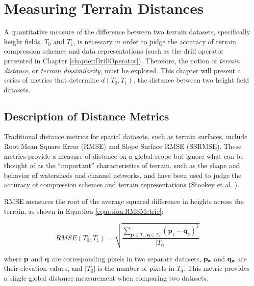\chapter{Measuring Terrain Distances}
\label{chapter:TerrainDistances}

A quantitative measure of the difference between two terrain datasets, specifically height fields, $T_{0}$ and $T_{1}$, is necessary 
in order to judge the accuracy of terrain compression schemes and data representations (such as the drill operator presented in Chapter \ref{chapter:DrillOperator}).
Therefore, the notion of \textit{terrain distance}, or \textit{terrain dissimilarity}, must be explored. This chapter will present a series of metrics that determine $d\left(T_{0}, T_{1}\right)$, the distance between two height field datasets.

\section{Description of Distance Metrics}
\label{section:DescriptionOfMetrics}

Traditional distance metrics for spatial datasets, such as terrain surfaces, include Root Mean Square Error (RMSE) and Slope Surface RMSE (SSRMSE). These metrics provide a measure of 
distance on a global scope but ignore what can be thought of as the ``important'' characteristics of terrain, such as the shape and behavior of watersheds and channel networks,
and have been used to judge the accuracy of compression schemes and terrain representations (Stookey et al. \cite{Stookey08parallelodetlap}).


RMSE measures the root of the average squared difference in heights across the terrain, as shown in Equation \ref{equation:RMSMetric}:

\begin{equation}
\label{equation:RMSMetric}
  RMSE\left(T_{0}, T_{1}\right) = \sqrt{ \frac{\displaystyle\sum_{\textbf{p}\in T_{0}, \textbf{q} \in T_{1}}{ \left(\textbf{p}_{z} - \textbf{q}_{z} \right)^2 } }{ |T_{0}| } }
\end{equation}

\noindent where $\bf{p}$ and $\bf{q}$ are corresponding pixels in two separate datasets, $\bf{p}_{z}$ and $\bf{q}_{z}$ are their elevation values, and 
$|T_{0}|$ is the number of pixels in $T_{0}$.
This metric provides a single global distance measurement when comparing two datasets.

